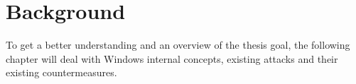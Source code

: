 \section{Background}
\label{sec:background}
To get a better understanding and an overview of the thesis goal, the following chapter will deal with Windows internal concepts, existing attacks and their existing countermeasures.


